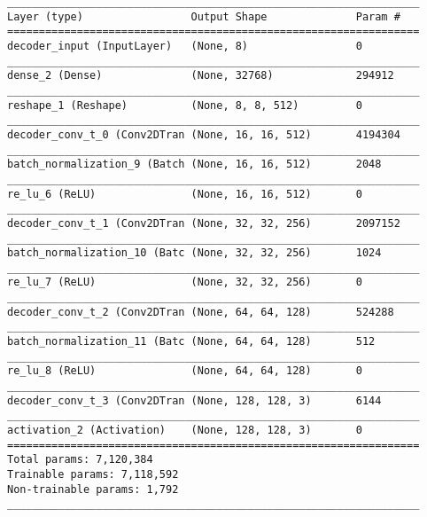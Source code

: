 \begin{lstlisting}[caption={CelebA-VAE-GAN Decoder},captionpos=b,basicstyle=\tiny, label={lst:mnist-vae-decoder}]
_________________________________________________________________
Layer (type)                 Output Shape              Param #
=================================================================
decoder_input (InputLayer)   (None, 8)                 0
_________________________________________________________________
dense_2 (Dense)              (None, 32768)             294912
_________________________________________________________________
reshape_1 (Reshape)          (None, 8, 8, 512)         0
_________________________________________________________________
decoder_conv_t_0 (Conv2DTran (None, 16, 16, 512)       4194304
_________________________________________________________________
batch_normalization_9 (Batch (None, 16, 16, 512)       2048
_________________________________________________________________
re_lu_6 (ReLU)               (None, 16, 16, 512)       0
_________________________________________________________________
decoder_conv_t_1 (Conv2DTran (None, 32, 32, 256)       2097152
_________________________________________________________________
batch_normalization_10 (Batc (None, 32, 32, 256)       1024
_________________________________________________________________
re_lu_7 (ReLU)               (None, 32, 32, 256)       0
_________________________________________________________________
decoder_conv_t_2 (Conv2DTran (None, 64, 64, 128)       524288
_________________________________________________________________
batch_normalization_11 (Batc (None, 64, 64, 128)       512
_________________________________________________________________
re_lu_8 (ReLU)               (None, 64, 64, 128)       0
_________________________________________________________________
decoder_conv_t_3 (Conv2DTran (None, 128, 128, 3)       6144
_________________________________________________________________
activation_2 (Activation)    (None, 128, 128, 3)       0
=================================================================
Total params: 7,120,384
Trainable params: 7,118,592
Non-trainable params: 1,792
_________________________________________________________________
\end{lstlisting}